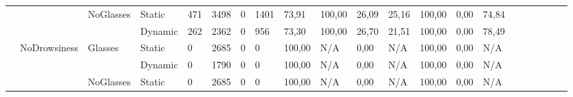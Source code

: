 \documentclass[12pt]{article}
\begin{document}
\begin{landscape}
\begin{table}[]
\begin{adjustbox}{width=1.4\textwidth}
\begin{tabular}{lllllllllllllllccllll}
				\multicolumn{1}{|l|}{} & \multicolumn{1}{l|}{} & \multicolumn{1}{l|}{\multirow{2}{*}{NoGlasses}} & \multicolumn{1}{l|}{Static}  & \multicolumn{1}{l|}{471} & \multicolumn{1}{l|}{3498} & \multicolumn{1}{l|}{0} & \multicolumn{1}{l|}{1401} & \multicolumn{1}{l|}{73,91} & \multicolumn{1}{l|}{100,00} & \multicolumn{1}{l|}{26,09} & \multicolumn{1}{l|}{25,16} & \multicolumn{1}{l|}{100,00} & \multicolumn{1}{l|}{0,00} & \multicolumn{1}{l|}{74,84} & \multicolumn{1}{c|}{} & \multicolumn{1}{c|}{} & \multicolumn{1}{l|}{} & \multicolumn{1}{l|}{} & \multicolumn{1}{l|}{} & \multicolumn{1}{l|}{}\\ \cline{4-15}
				\multicolumn{1}{|l|}{} & \multicolumn{1}{l|}{} & \multicolumn{1}{l|}{} & \multicolumn{1}{l|}{Dynamic} & \multicolumn{1}{l|}{262} & \multicolumn{1}{l|}{2362} & \multicolumn{1}{l|}{0} & \multicolumn{1}{l|}{956} & \multicolumn{1}{l|}{73,30} & \multicolumn{1}{l|}{100,00} & \multicolumn{1}{l|}{26,70} & \multicolumn{1}{l|}{21,51} & \multicolumn{1}{l|}{100,00} & \multicolumn{1}{l|}{0,00} & \multicolumn{1}{l|}{78,49} & \multicolumn{1}{c|}{} & \multicolumn{1}{c|}{} & \multicolumn{1}{l|}{} & \multicolumn{1}{l|}{} & \multicolumn{1}{l|}{} & \multicolumn{1}{l|}{} \\ \cline{2-15}
				\multicolumn{1}{|l|}{} & \multicolumn{1}{l|}{\multirow{4}{*}{NoDrowsiness}} & \multicolumn{1}{l|}{\multirow{2}{*}{Glasses}} & \multicolumn{1}{l|}{Static} & \multicolumn{1}{l|}{0} & \multicolumn{1}{l|}{2685} & \multicolumn{1}{l|}{0} & \multicolumn{1}{l|}{0} & \multicolumn{1}{l|}{100,00} & \multicolumn{1}{l|}{N/A} & \multicolumn{1}{l|}{0,00} & \multicolumn{1}{l|}{N/A} & \multicolumn{1}{l|}{100,00} & \multicolumn{1}{l|}{0,00} & \multicolumn{1}{l|}{N/A} & \multicolumn{1}{c|}{} & \multicolumn{1}{c|}{} & \multicolumn{1}{l|}{} & \multicolumn{1}{l|}{} & \multicolumn{1}{l|}{} & \multicolumn{1}{l|}{}\\ \cline{4-15}
				\multicolumn{1}{|l|}{} & \multicolumn{1}{l|}{} & \multicolumn{1}{l|}{} & \multicolumn{1}{l|}{Dynamic} & \multicolumn{1}{l|}{0} & \multicolumn{1}{l|}{1790} & \multicolumn{1}{l|}{0} & \multicolumn{1}{l|}{0} & \multicolumn{1}{l|}{100,00} & \multicolumn{1}{l|}{N/A} & \multicolumn{1}{l|}{0,00} & \multicolumn{1}{l|}{N/A} & \multicolumn{1}{l|}{100,00} & \multicolumn{1}{l|}{0,00} & \multicolumn{1}{l|}{N/A} & \multicolumn{1}{c|}{} & \multicolumn{1}{c|}{} & \multicolumn{1}{l|}{} & \multicolumn{1}{l|}{} & \multicolumn{1}{l|}{} & \multicolumn{1}{l|}{}\\ \cline{3-15}
				\multicolumn{1}{|l|}{} & \multicolumn{1}{l|}{} & \multicolumn{1}{l|}{\multirow{2}{*}{NoGlasses}} & \multicolumn{1}{l|}{Static} & \multicolumn{1}{l|}{0} & \multicolumn{1}{l|}{2685} & \multicolumn{1}{l|}{0} & \multicolumn{1}{l|}{0} & \multicolumn{1}{l|}{100,00} & \multicolumn{1}{l|}{N/A} & \multicolumn{1}{l|}{0,00} & \multicolumn{1}{l|}{N/A} & \multicolumn{1}{l|}{100,00} & \multicolumn{1}{l|}{0,00} & \multicolumn{1}{l|}{N/A} & \multicolumn{1}{c|}{} & \multicolumn{1}{c|}{} & \multicolumn{1}{l|}{} & \multicolumn{1}{l|}{} & \multicolumn{1}{l|}{} & \multicolumn{1}{l|}{} \\ \cline{4-15}

\end{tabular}
\end{adjustbox}
\end{table}
\end{landscape}
\end{document}
